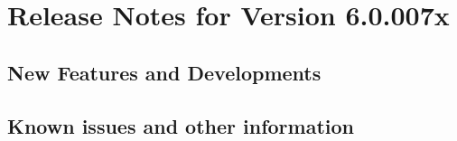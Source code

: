 \makeatletter
\section{Release Notes for \app{} Version 6.0.007x}
\makeatother

\subsection{New Features and Developments}


\subsection{Known issues and other information}

